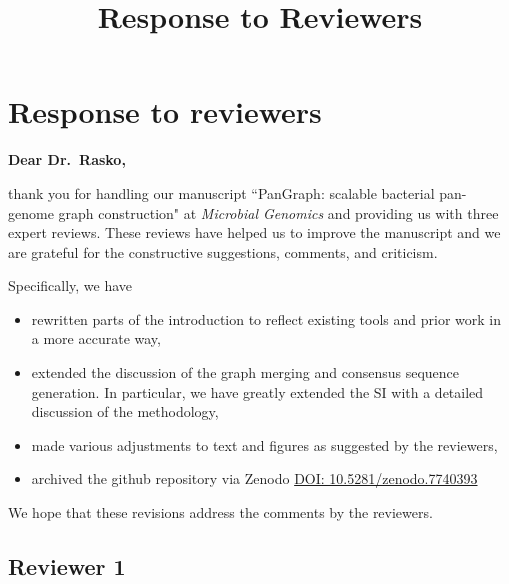 \documentclass[aps,rmp,onecolumn]{revtex4-1}
\title{Response to Reviewers}
\begin{document}
\maketitle

\section*{Response to reviewers}

{\bf Dear Dr.~Rasko,}

thank you for handling our manuscript ``PanGraph: scalable bacterial pan-genome graph construction" at {\it Microbial Genomics} and providing us with three expert reviews.
These reviews have helped us to improve the manuscript and we are grateful for the constructive suggestions, comments, and criticism.

Specifically, we have
\begin{itemize}
    \item rewritten parts of the introduction to reflect existing tools and prior work in a more accurate way,
    \item extended the discussion of the graph merging and consensus sequence generation. In particular, we have greatly extended the SI with a detailed discussion of the methodology,
    \item made various adjustments to text and figures as suggested by the reviewers,
    \item archived the github repository via Zenodo \href{https://doi.org/10.5281/zenodo.7740393}{DOI: 10.5281/zenodo.7740393}
\end{itemize}

We hope that these revisions address the comments by the reviewers.

\subsection*{Reviewer 1}
\end{document}
